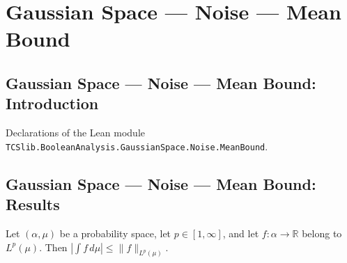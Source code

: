 \section{Gaussian Space --- Noise --- Mean Bound}
\subsection*{Gaussian Space --- Noise --- Mean Bound: Introduction}

Declarations of the Lean module \texttt{TCSlib.BooleanAnalysis.GaussianSpace.Noise.MeanBound}.

\subsection*{Gaussian Space --- Noise --- Mean Bound: Results}

\begin{lemma}
\label{BooleanAnalysis.GaussianSpace.norm_integral_le_toReal_eLpNorm}
\leanok
{}
Let $(\alpha,\mu)$ be a probability space, let $p\in[1,\infty]$, and let
$f\colon\alpha\to\mathbb R$ belong to $L^p(\mu)$. Then $\left|\int
f\,d\mu\right|\leq\|f\|_{L^p(\mu)}$.
\end{lemma}
